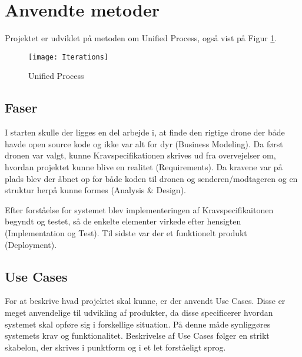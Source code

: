 \documentclass[Main]{subfiles}
\begin{document}
\section{Anvendte metoder}

Projektet er udviklet på metoden om Unified Process\cite[s. 74]{Larman}, også vist på Figur \ref{Fig:UP}.

\begin{figure}[H]
\centering
\texttt{[image: Iterations]}
\caption{Unified Process}
\label{Fig:UP}
\end{figure}



\subsection{Faser}
I starten skulle der ligges en del arbejde i, at finde den rigtige drone der både havde open source kode og ikke var alt for dyr (Business Modeling).
Da først dronen var valgt, kunne Kravspecifikationen\cite{Kravspec} skrives ud fra overvejelser om, hvordan projektet kunne blive en realitet (Requirements).
Da kravene var på plads blev der åbnet op for både koden til dronen og senderen/modtageren og en struktur herpå kunne formes (Analysis \& Design).

Efter forståelse for systemet blev implementeringen af Kravspecifikaitonen begyndt og testet, så de enkelte elementer virkede efter hensigten (Implementation og Test).
Til sidste var der et funktionelt produkt (Deployment).




\subsection{Use Cases}
For at beskrive hvad projektet skal kunne, er der anvendt Use Cases.
Disse er meget anvendelige til udvikling af produkter, da disse specificerer hvordan systemet skal opføre sig i forskellige situation.
På denne måde synliggøres systemets krav og funktionalitet.
Beskrivelse af Use Cases følger en strikt skabelon, der skrives i punktform og i et let forståeligt sprog.
\end{document}
